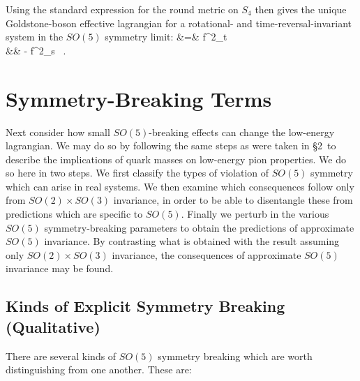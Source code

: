 \documentclass[12pt,epsf]{report}
\begin{document}
Using the standard expression for the round metric on $S_4$
then gives the unique Goldstone-boson effective lagrangian
for a rotational- and time-reversal-invariant system in the
$SO(5)$ symmetry limit:
%
\bg
\label{kintermanglesinv}
\Scl &=& {f^2_t }  \nn\\
&& \qquad \qquad - \;  {f^2_s } \;  \, .\nn
\nd

\section{Symmetry-Breaking Terms}

Next consider how small $SO(5)$-breaking effects can change
the low-energy lagrangian. We may do so by following the
same steps as were taken in \S2\ to describe the
implications of quark masses on low-energy pion properties.
We do so here in two steps. We first classify the types of
violation of $SO(5)$ symmetry which can arise in real
systems. We then examine which consequences follow only
from $SO(2) \times SO(3)$ invariance, in order to be able
to disentangle these from predictions which are specific to
$SO(5)$. Finally we perturb in the various $SO(5)$
symmetry-breaking parameters to obtain the predictions of
approximate $SO(5)$ invariance. By contrasting what is
obtained with the result assuming only $SO(2) \times SO(3)$
invariance, the consequences of approximate $SO(5)$
invariance may be found.

\subsection{Kinds of Explicit Symmetry Breaking
(Qualitative)}

There are several kinds of $SO(5)$ symmetry breaking which
are worth distinguishing from one another. These are:
\end{document}
